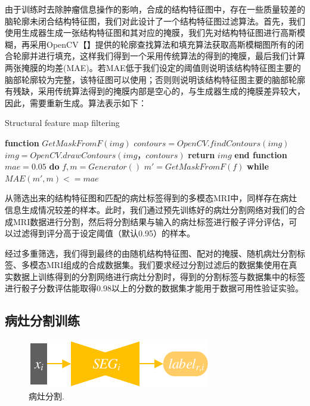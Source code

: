 \documentclass[letterpaper]{article} %
\begin{document}
由于训练时去除肿瘤信息操作的影响，合成的结构特征图中，存在一些质量较差的脑轮廓未闭合结构特征图，我们对此设计了一个结构特征图过滤算法。首先，我们使用生成器生成一张结构特征图和其对应的掩膜，我们先对结构特征图进行高斯模糊\cite{92wink2004denoising}，再采用OpenCV【】提供的轮廓查找算法和填充算法获取高斯模糊图所有的闭合轮廓并进行填充，这样我们得到一个采用传统算法的得到的掩膜，最后我们计算两张掩膜的均差(MAE)。若MAE低于我们设定的阈值则说明该结构特征图主要的脑部轮廓较为完整，该特征图可以使用；否则则说明该结构特征图主要的脑部轮廓有残缺，采用传统算法得到的掩膜内部是空心的，与生成器生成的掩膜差异较大，因此，需要重新生成。算法表示如下：
\begin{algorithm}
	\caption{Structural feature map filtering}
	\label{alg:3}
	\begin{algorithmic}[1]
		\State \textbf{function} $GetMaskFromF(img)$
		\State \indent$contours = OpenCV.findContours(img)$
		\State \indent$img =OpenCV.drawContours(img，contours)$
		\State \indent\textbf{return} $img$
		\State \textbf{end function}
		\State
		\State $mae=0.05$
		\State \textbf{do} 
		\State \indent$f, m = Generator()$
		\State \indent$m'= GetMaskFromF(f)$
		\State \textbf{while} $MAE(m',m) <= mae$
	\end{algorithmic}  
\end{algorithm}

从筛选出来的结构特征图和匹配的病灶标签得到的多模态MRI中，同样存在病灶信息生成情况较差的样本。此时，我们通过预先训练好的病灶分割网络对我们的合成MRI数据进行分割，然后将分割结果与输入的病灶标签进行骰子评分评估，可以过滤得到评分高于设定阈值（默认0.95）的样本。

经过多重筛选，我们得到最终的由随机结构特征图、配对的掩膜、随机病灶分割标签、多模态MRI组成的合成数据集。我们要求经过分割过滤后的数据集使用在真实数据上训练得到的分割网络进行病灶分割时，得到的分割标签与数据集中的标签进行骰子分数评估能取得0.98以上的分数的数据集才能用于数据可用性验证实验。

\subsection{病灶分割训练}
\begin{figure}
	\centering
	\includegraphics[width=0.45\columnwidth]{figures/segmentation}
	\caption{病灶分割.}
	\label{segmentation}
\end{figure}
\end{document}
